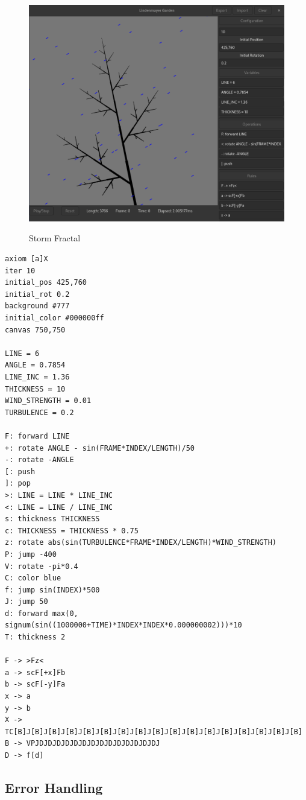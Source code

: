 \documentclass[a4paper]{article}
\begin{document}
\pagebreak

\begin{figure}[h]
    \includegraphics[width=\textwidth]{media/gui/gui-storm.png}
    \label{fig:storm}
    \caption{Storm Fractal}
\end{figure}

\begin{lstlisting}[style=boxed]
axiom [a]X
iter 10
initial_pos 425,760
initial_rot 0.2
background #777
initial_color #000000ff
canvas 750,750

LINE = 6
ANGLE = 0.7854
LINE_INC = 1.36
THICKNESS = 10
WIND_STRENGTH = 0.01
TURBULENCE = 0.2

F: forward LINE
+: rotate ANGLE - sin(FRAME*INDEX/LENGTH)/50
-: rotate -ANGLE
[: push
]: pop
>: LINE = LINE * LINE_INC
<: LINE = LINE / LINE_INC
s: thickness THICKNESS
c: THICKNESS = THICKNESS * 0.75
z: rotate abs(sin(TURBULENCE*FRAME*INDEX/LENGTH)*WIND_STRENGTH)
P: jump -400
V: rotate -pi*0.4
C: color blue
f: jump sin(INDEX)*500
J: jump 50
d: forward max(0, signum(sin((1000000+TIME)*INDEX*INDEX*0.000000002)))*10
T: thickness 2

F -> >Fz<
a -> scF[+x]Fb
b -> scF[-y]Fa
x -> a
y -> b
X -> TC[B]J[B]J[B]J[B]J[B]J[B]J[B]J[B]J[B]J[B]J[B]J[B]J[B]J[B]J[B]J[B]J[B]
B -> VPJDJDJDJDJDJDJDJDJDJDJDJDJDJDJ
D -> f[d]
\end{lstlisting}

\pagebreak

\subsection{Error Handling}
\end{document}
